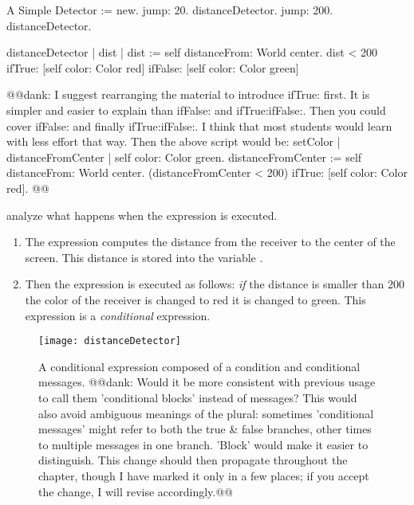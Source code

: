 {\begin{scriptwithtitle}{A Simple Detector}\label{scr:detector}
\caro := \Turtle new. 
\caro jump: 20.
\caro distanceDetector.
\caro jump: 200.
\caro distanceDetector.
\end{scriptwithtitle}


\begin{method}\label{mth:detector}
distanceDetector
   | dist | 
   dist := self distanceFrom: World center.
   dist < 200
      ifTrue: [self color: Color red]
      ifFalse: [self color: Color green]
\end{method}
@@dank: I suggest rearranging the material to introduce ifTrue: first.  It is simpler and easier to explain than ifFalse: and ifTrue:ifFalse:.  Then you could cover ifFalse: and finally ifTrue:ifFalse:.  I think that most students would learn with less effort that way. Then the above script would be:
	setColor
		| distanceFromCenter |
		self color: Color green.
		distanceFromCenter := self distanceFrom: World center.
		(distanceFromCenter < 200)
			ifTrue: [self color: Color red].
@@
	

 analyze  what happens when the expression  is executed. 

\begin{enumerate}
\item The expression  computes the distance from the receiver to the center of the screen. This distance is stored into the variable . 

\item Then the expression  is executed as follows: \textit{if} the distance is smaller than 200\add{,} the color of the receiver is changed to red it is changed to green. This expression is a \textit{conditional} expression. 
 
\end{enumerate}

\begin{figure}[h]
\begin{center}
\texttt{[image: distanceDetector]}
\caption{A conditional expression  composed of a condition and conditional messages.
@@dank: Would it be more consistent with previous usage to call them 'conditional blocks' instead of messages?  This would also avoid ambiguous meanings of the plural: sometimes 'conditional messages' might refer to both the true & false branches, other times to multiple messages in one branch. 'Block' would make it easier to distinguish. This change should then propagate throughout the chapter, though I have marked it only in a few places; if you accept the change, I will revise accordingly.@@\label{fig:distanceDetector}}
\end{center}
\end{figure}

}
